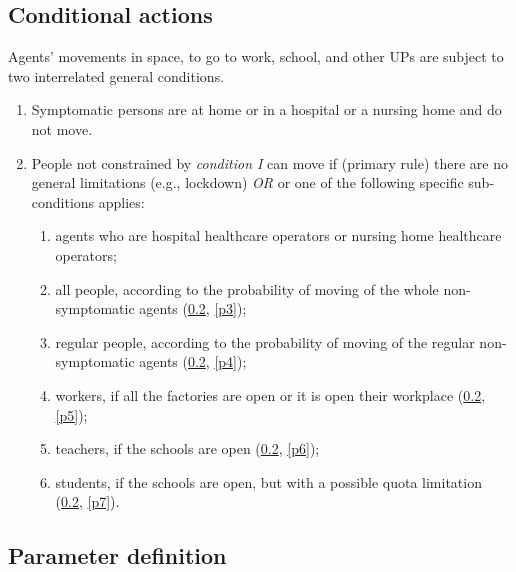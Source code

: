 \documentclass[graybox]{svmult}
\begin{document}
\subsection{Conditional actions}
\label{cond}

Agents' movements in space, to go to work, school, and other UPs are subject to two interrelated general conditions.

\begin{enumerate}[label=\Roman*]

\item Symptomatic persons are at home or in a hospital or a nursing home and do not move. 

\item People not constrained by \emph{condition I} can move if (primary rule) there are no general limitations (e.g., lockdown) \emph{OR} or one of the following specific sub-conditions applies:

\begin{enumerate}
\item agents who are hospital healthcare operators or nursing home healthcare operators;

\item all people, according to the probability of moving of the whole non-symptomatic agents (\ref{par}, \ref{p3});

\item regular people, according to the probability of moving of the regular non-symptomatic agents
(\ref{par}, \ref{p4});

\item workers, if all the factories are open or it is open their workplace
(\ref{par}, \ref{p5});

\item teachers, if the schools are open
(\ref{par}, \ref{p6});

\item students, if the schools are open, but with a possible quota limitation
(\ref{par}, \ref{p7}).

\end{enumerate}

\end{enumerate}


\subsection{Parameter definition}
\label{par}
\end{document}
